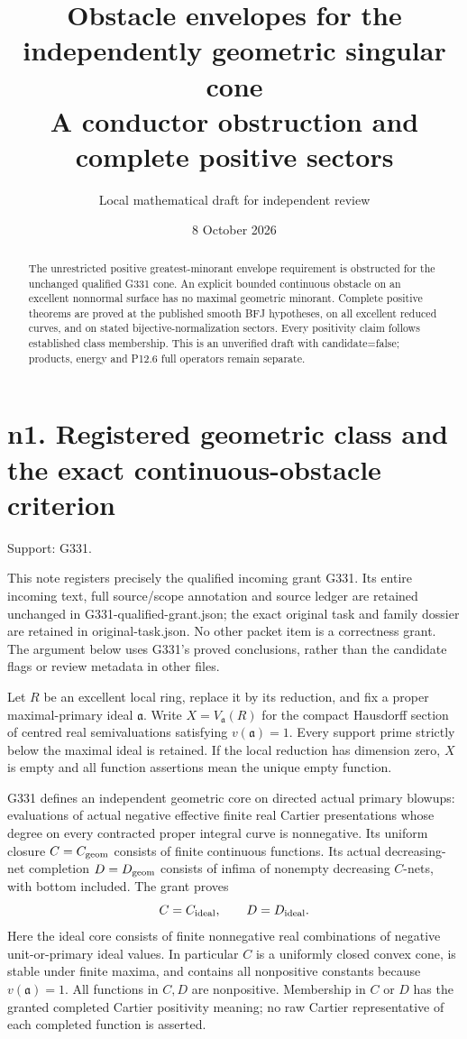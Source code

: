 \documentclass[11pt]{article}
\title{Obstacle envelopes for the independently geometric singular cone\\
A conductor obstruction and complete positive sectors}
\author{Local mathematical draft for independent review}
\date{8 October 2026}
\begin{document}
\maketitle
\begin{abstract}
The unrestricted positive greatest-minorant envelope requirement is obstructed for the unchanged qualified G331 cone. An explicit bounded continuous obstacle on an excellent nonnormal surface has no maximal geometric minorant. Complete positive theorems are proved at the published smooth BFJ hypotheses, on all excellent reduced curves, and on stated bijective-normalization sectors. Every positivity claim follows established class membership. This is an unverified draft with candidate=false; products, energy and P12.6 full operators remain separate.
\end{abstract}
\tableofcontents
\newpage
\section{n1. Registered geometric class and the exact continuous-obstacle criterion}

Support: G331.

This note registers precisely the qualified incoming grant G331. Its entire incoming text, full source/scope annotation and source ledger are retained unchanged in G331-qualified-grant.json; the exact original task and family dossier are retained in original-task.json. No other packet item is a correctness grant. The argument below uses G331's proved conclusions, rather than the candidate flags or review metadata in other files.

Let \(R\) be an excellent local ring, replace it by its reduction, and fix a proper maximal-primary ideal \(\mathfrak a\). Write \(X=V_{\mathfrak a}(R)\) for the compact Hausdorff section of centred real semivaluations satisfying \(v(\mathfrak a)=1\). Every support prime strictly below the maximal ideal is retained. If the local reduction has dimension zero, \(X\) is empty and all function assertions mean the unique empty function.

G331 defines an independent geometric core on directed actual primary blowups: evaluations of actual negative effective finite real Cartier presentations whose degree on every contracted proper integral curve is nonnegative. Its uniform closure \(C=C_{\rm geom}\) consists of finite continuous functions. Its actual decreasing-net completion \(D=D_{\rm geom}\) consists of infima of nonempty decreasing \(C\)-nets, with bottom included. The grant proves
\[
C=C_{\rm ideal},\qquad D=D_{\rm ideal}.
\]
Here the ideal core consists of finite nonnegative real combinations of negative unit-or-primary ideal values. In particular \(C\) is a uniformly closed convex cone, is stable under finite maxima, and contains all nonpositive constants because \(v(\mathfrak a)=1\). All functions in \(C,D\) are nonpositive. Membership in \(C\) or \(D\) has the granted completed Cartier positivity meaning; no raw Cartier representative of each completed function is asserted.
\end{document}
